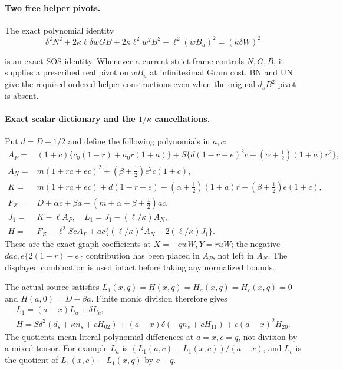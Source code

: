 \paragraph{Two free helper pivots.}
The exact polynomial identity
\[
 \delta^2N^2+2\kappa\ell\delta wGB
       +2\kappa\ell^2w^2B^2-\ell^2(wB_u)^2
                  =(\kappa\delta W)^2
 \tag{SN8}
\]

is an exact SOS identity.  Whenever a current strict frame controls
$N,G,B$, it supplies a prescribed real pivot on $wB_u$ at
infinitesimal Gram cost.  BN and UN give the required ordered helper
constructions even when the original $d_sB^2$ pivot is absent.

\paragraph{Exact scalar dictionary and the $1/\kappa$ cancellations.}
Put $d=D+1/2$ and define the following polynomials in $a,c$:
\[
\begin{split}
 A_P={}&(1+c)\{c_0(1-r)+a_0r(1+a)\}
       +S\{d(1-r-e)^2c+(\alpha+\tfrac12)(1+a)r^2\},\\
 A_N={}&m(1+ra+ec)^2+(\beta+\tfrac12)e^2c(1+c),\\
 K={}&m(1+ra+ec)+d(1-r-e)
       +(\alpha+\tfrac12)(1+a)r+(\beta+\tfrac12)e(1+c),\\
 F_Z={}&D+\alpha c+\beta a+(m+\alpha+\beta+\tfrac12)ac,\\
 J_1={}&K-\ell A_P,\quad L_1=J_1-(\ell/\kappa)A_N,\\
 H={}&F_Z-\ell^2ScA_P
                 +ac\{(\ell/\kappa)^2A_N-2(\ell/\kappa)J_1\}.
\end{split}\tag{SN9}
\]
These are the exact graph coefficients at $X=-ewW,Y=ruW$;
the negative $dac,e\{2(1-r)-e\}$ contribution has been placed
in $A_P$, not left in $A_N$. The displayed combination is used intact before taking any
normalized bounds.

The actual source satisfies
$L_1(x,q)=H(x,q)=H_a(x,q)=H_c(x,q)=0$ and
$H(a,0)=D+\beta a$. Finite monic division therefore gives
\[
\begin{gathered}
 L_1=(a-x)L_a+\delta L_c,\\
 H=S\delta^2(d_s+\kappa n_s+cH_{02})
        +(a-x)\delta(-qn_s+cH_{11})+c(a-x)^2H_{20}.
\end{gathered}\tag{SN10}
\]
The quotients mean literal polynomial differences at $a=x,c=q$,
not division by a mixed tensor. For example $L_a$ is
$(L_1(a,c)-L_1(x,c))/(a-x)$, and $L_c$ is the quotient of
$L_1(x,c)-L_1(x,q)$ by $c-q$.

